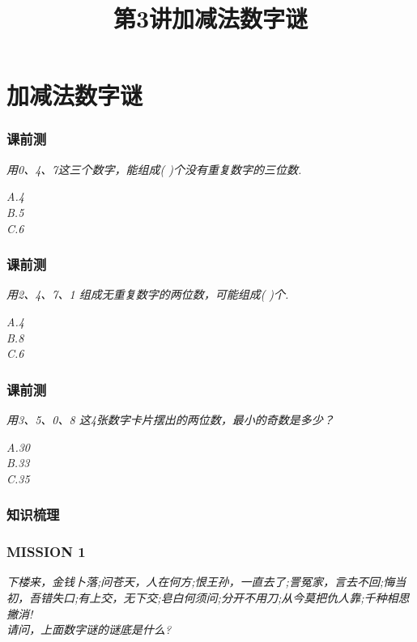 \section{加减法数字谜}

\title[第3讲\quad 加减法数字谜]{第3讲\quad 加减法数字谜} 
\author{}
\date{}
\begin{frame}
    \titlepage
\end{frame}

\begin{frame}
    \frametitle{课前测}
    \textit{用0、4、7这三个数字，能组成( )个没有重复数字的三位数.}

    \textit{A.4\\ B.5\\ C.6}
\end{frame}

\begin{frame}
    \frametitle{课前测}
    \textit{用2、4、7、1 组成无重复数字的两位数，可能组成( )个.}

    \textit{A.4\\ B.8\\ C.6}
\end{frame}

\begin{frame}
    \frametitle{课前测}
    \textit{用3、5、0、8 这4张数字卡片摆出的两位数，最小的奇数是多少？}

    \textit{A.30\\ B.33\\ C.35}
\end{frame}



\begin{frame}
    \frametitle{知识梳理}
\end{frame}

\begin{frame}
    \frametitle{MISSION 1}
    \textit{下楼来，金钱卜落;问苍天，人在何方;恨王孙，一直去了;詈冤家，言去不回;悔当初，吾错失口;有上交，无下交;皂白何须问;分开不用刀;从今莫把仇人靠;千种相思撇消!\\
    请问，上面数字谜的谜底是什么?}
\end{frame}

